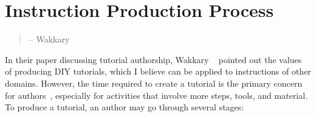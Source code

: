 













\section{Instruction Production Process}
\label{background_creation}

\begin{quote}
 -- Wakkary \ea{}~\cite{Wakkary:2015:TAH:2702123.2702550}
\end{quote}

In their paper discussing tutorial authorship, Wakkary \ea{}~\cite{Wakkary:2015:TAH:2702123.2702550} pointed out the values of producing DIY tutorials, which I believe can be applied to instructions of other domains. However, the time required to create a tutorial is the primary concern for authors~\cite{Kuznetsov:2010:REA:1868914.1868950}, especially for activities that involve more steps, tools, and material. To produce a tutorial, an author may go through several stages:


